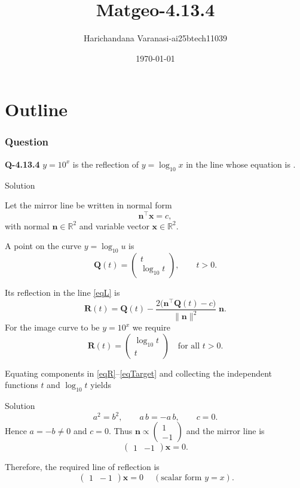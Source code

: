 \documentclass{beamer}
\title{Matgeo-4.13.4}
\author{Harichandana Varanasi-ai25btech11039}
\date{\today}
\theoremstyle{remark}
\newcommand{\myvec}[1]{\ensuremath{\begin{pmatrix}#1\end{pmatrix}}}
\let\vec\mathbf
\begin{document}
\begin{frame}
\titlepage
\end{frame}

\section*{Outline}

\begin{frame}
\frametitle{Question}

\noindent\textbf{Q-4.13.4} \;
$y=10^{x}$ is the reflection of $y=\log_{10}x$ in the line whose equation is \underline{\hspace{3cm}}.

\end{frame}
\begin{frame}{Solution}
    \renewcommand{\theequation}{\arabic{equation}}

Let the mirror line be written in normal form
\begin{equation}
  \vec{n}^{\top}\vec{x}=c,                                   \label{eqL}
\end{equation}
with normal $\vec{n}\in\mathbb{R}^{2}$ and variable vector $\vec{x}\in\mathbb{R}^{2}$.


A point on the curve $y=\log_{10}u$ is
\begin{equation}
    \vec{Q}(t)=\myvec{t\\ \log_{10}t}, \qquad t>0 .
\end{equation}


Its reflection in the line \eqref{eqL} is 
\begin{equation}
  \vec{R}(t)=\vec{Q}(t)-\frac{2\big(\vec{n}^{\top}\vec{Q}(t)-c\big)}{\|\vec{n}\|^{2}}\;\vec{n}. \label{eqR}
\end{equation}
For the image curve to be  $y=10^{x}$ we require
\begin{equation}
  \vec{R}(t)=\myvec{\log_{10}t\\ t}\quad \text{for all } t>0 . \label{eqTarget}
\end{equation}

Equating components in \eqref{eqR}--\eqref{eqTarget} and collecting the
independent functions $t$ and $\log_{10}t$ yields
\end{frame}
\begin{frame}{Solution}
    \begin{equation}
  a^{2}=b^{2}, \qquad a\,b=-a\,b, \qquad c=0 .
\end{equation}
Hence $a=-b\neq 0$ and $c=0$.  Thus $\vec{n}\propto\myvec{1\\ -1}$ and the mirror line is
\begin{equation}
  \myvec{1 & -1}\vec{x}=0.                                   \label{eqAns}
\end{equation}

Therefore, the required line of reflection is
\[
  \boxed{\ \myvec{1\;\; -1}\vec{x}=0\ }\quad (\text{scalar form } y=x).
\]
\endgroup
\end{frame}
\end{document}
